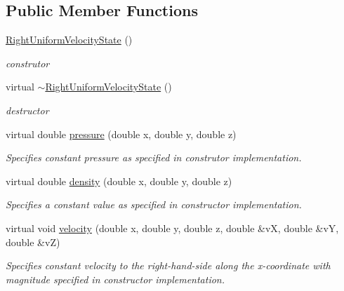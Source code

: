 \subsection*{Public Member Functions}
\begin{DoxyCompactItemize}
\item 
\hypertarget{classRightUniformVelocityState_a51896be232d136657185ffc58736f965}{\hyperlink{classRightUniformVelocityState_a51896be232d136657185ffc58736f965}{Right\-Uniform\-Velocity\-State} ()}\label{classRightUniformVelocityState_a51896be232d136657185ffc58736f965}

\begin{DoxyCompactList}\small\item\em construtor \end{DoxyCompactList}\item 
\hypertarget{classRightUniformVelocityState_aac4dfd87ac8205d053740e63fe2dcb29}{virtual \hyperlink{classRightUniformVelocityState_aac4dfd87ac8205d053740e63fe2dcb29}{$\sim$\-Right\-Uniform\-Velocity\-State} ()}\label{classRightUniformVelocityState_aac4dfd87ac8205d053740e63fe2dcb29}

\begin{DoxyCompactList}\small\item\em destructor \end{DoxyCompactList}\item 
virtual double \hyperlink{classRightUniformVelocityState_a41ca22d5beb3fd17f886f042045ef967}{pressure} (double x, double y, double z)
\begin{DoxyCompactList}\small\item\em Specifies constant pressure as specified in construtor implementation. \end{DoxyCompactList}\item 
virtual double \hyperlink{classRightUniformVelocityState_abaca416f928a101f2a377305b68a6cf8}{density} (double x, double y, double z)
\begin{DoxyCompactList}\small\item\em Specifies a constant value as specified in constructor implementation. \end{DoxyCompactList}\item 
virtual void \hyperlink{classRightUniformVelocityState_add7cfe377e19f73b91cac77379770607}{velocity} (double x, double y, double z, double \&v\-X, double \&v\-Y, double \&v\-Z)
\begin{DoxyCompactList}\small\item\em Specifies constant velocity to the right-\/hand-\/side along the x-\/coordinate with magnitude specified in constructor implementation. \end{DoxyCompactList}\end{DoxyCompactItemize}


